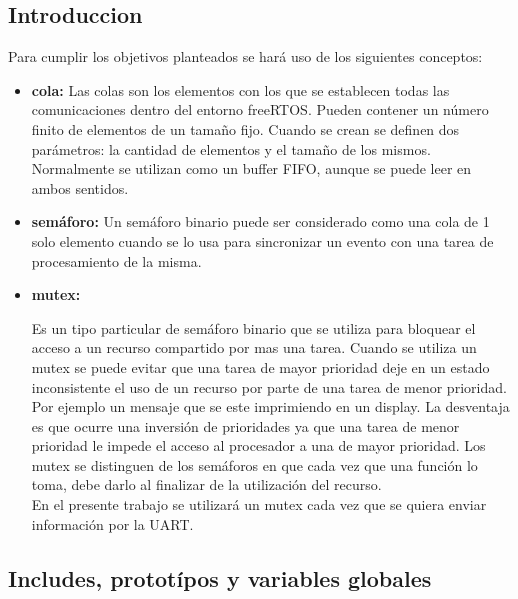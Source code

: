 \documentclass[a4paper,12pt]{article}
\begin{document}
\subsection{Introduccion} 
Para cumplir los objetivos planteados se hará uso de los siguientes conceptos:\\
\begin{itemize}

\item {\textbf{cola:}}
Las colas son los elementos con los que se establecen todas las comunicaciones dentro del entorno freeRTOS.  Pueden contener un número finito de elementos de un tamaño fijo.  Cuando se crean se definen dos parámetros: la cantidad de elementos y el tamaño de los mismos.  Normalmente se utilizan como un buffer FIFO, aunque se puede leer en ambos sentidos.

\item {\textbf{semáforo:}}
Un semáforo binario puede ser considerado como una cola de 1 solo elemento cuando se lo usa para sincronizar un evento con una tarea de procesamiento de la misma.

\item {\textbf{mutex:}}

Es un tipo particular de semáforo binario que se utiliza para bloquear el acceso a un recurso compartido por  mas una tarea.  Cuando se utiliza un mutex se puede evitar que una tarea de mayor prioridad deje en un estado inconsistente el uso de un recurso por parte de una tarea de menor prioridad.  Por ejemplo un mensaje que se este imprimiendo en un display.  La desventaja es que ocurre una inversión de prioridades ya que una tarea de menor prioridad le impede el acceso al procesador a una de mayor prioridad. Los mutex se distinguen de los semáforos en que cada vez que una función lo toma, debe darlo al finalizar de la utilización del recurso.\\

En el presente trabajo se utilizará un mutex cada vez que se quiera enviar información por la UART.\\

\end{itemize}

\subsection{Includes, prototípos y variables globales}
\end{document}
